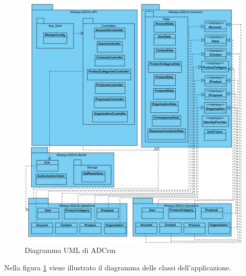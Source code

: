 
\begin{figure}[H]
	\centering
	\includegraphics[width=\linewidth]{images/general2}
	\caption{Diagramma UML di ADCrm}
	\label{fig:modulesdiagram}
\end{figure}
\newpage
Nella figura \ref{fig:modulesdiagram} viene illustrato il diagramma  delle classi dell'applicazione.

